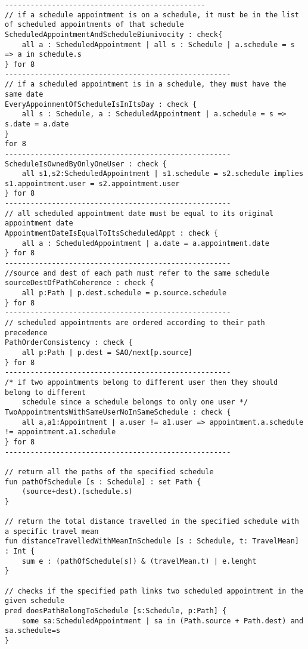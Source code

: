 \begin{lstlisting}
-----------------------------------------------
// if a schedule appointment is on a schedule, it must be in the list of scheduled appointments of that schedule
ScheduledAppointmentAndScheduleBiunivocity : check{
	all a : ScheduledAppointment | all s : Schedule | a.schedule = s => a in schedule.s
} for 8
-----------------------------------------------------
// if a scheduled appointment is in a schedule, they must have the same date
EveryAppoinmentOfScheduleIsInItsDay : check {
	all s : Schedule, a : ScheduledAppointment | a.schedule = s => s.date = a.date
}
for 8
-----------------------------------------------------
ScheduleIsOwnedByOnlyOneUser : check {
	all s1,s2:ScheduledAppointment | s1.schedule = s2.schedule implies s1.appointment.user = s2.appointment.user
} for 8
-----------------------------------------------------
// all scheduled appointment date must be equal to its original appointment date
AppointmentDateIsEqualToItsScheduledAppt : check {
	all a : ScheduledAppointment | a.date = a.appointment.date
} for 8
-----------------------------------------------------
//source and dest of each path must refer to the same schedule
sourceDestOfPathCoherence : check {
	all p:Path | p.dest.schedule = p.source.schedule
} for 8
-----------------------------------------------------
// scheduled appointments are ordered according to their path precedence
PathOrderConsistency : check {
	all p:Path | p.dest = SAO/next[p.source]
} for 8
-----------------------------------------------------
/* if two appointments belong to different user then they should belong to different 
    schedule since a schedule belongs to only one user */ 
TwoAppointmentsWithSameUserNoInSameSchedule : check {
	all a,a1:Appointment | a.user != a1.user => appointment.a.schedule != appointment.a1.schedule
} for 8
-----------------------------------------------------

// return all the paths of the specified schedule
fun pathOfSchedule [s : Schedule] : set Path {
	(source+dest).(schedule.s)
}

// return the total distance travelled in the specified schedule with a specific travel mean
fun distanceTravelledWithMeanInSchedule [s : Schedule, t: TravelMean] : Int {
	sum e : (pathOfSchedule[s]) & (travelMean.t) | e.lenght
}

// checks if the specified path links two scheduled appointment in the given schedule
pred doesPathBelongToSchedule [s:Schedule, p:Path] {
	some sa:ScheduledAppointment | sa in (Path.source + Path.dest) and sa.schedule=s
}


\end{lstlisting}
